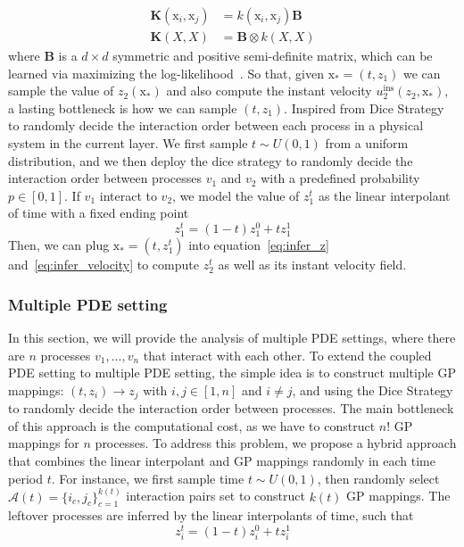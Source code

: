 \documentclass{article}
\begin{document}
\begin{align}
    \mathbf{K}(\mathrm{x}_i, \mathrm{x}_j) &= k(\mathrm{x}_i, \mathrm{x}_j) \mathbf{B} \\
    \mathbf{K}(X, X) &= \mathbf{B} \otimes k(X,X)
\end{align}
where $\mathbf{B}$ is a $d \times d$ symmetric and positive semi-definite matrix, which can be learned via maximizing the log-likelihood~\citep{BonillaMultitaskGauss}.
So that, given $\mathrm{x}_* =(t, z_1)$ we can sample the value of $z_2(\mathrm{x}_*)$ and also compute the instant velocity $u^{\text{ins}}_2 (z_2, \mathrm{x}_*)$, a lasting bottleneck is how we can sample $(t, z_1)$. Inspired from Dice Strategy~\citep{xiao2023coupled} to randomly decide the interaction order between each process in a physical system in the current layer. We first sample $t \sim U(0,1)$ from a uniform distribution, and we then deploy the dice strategy to randomly decide the interaction order between processes $v_1$ and $v_2$ with a predefined probability $p \in [0,1]$. If $v_1$ interact to $v_2$, we model the value of $z^t_1$ as the linear interpolant of time with a fixed ending point
\begin{equation}
    z^t_1 = (1-t)z^0_1 + t z^1_1
\end{equation}
Then, we can plug $\mathrm{x}_* =(t, z^t_1)$ into equation~\ref{eq:infer_z} and~\ref{eq:infer_velocity} to compute $z^t_2$ as well as its instant velocity field.
\subsubsection{Multiple PDE setting}
\label{sec:Gaussian_multiple}
In this section, we will provide the analysis of multiple PDE settings, where there are $n$ processes $v_1, ..., v_n$ that interact with each other. To extend the coupled PDE setting to multiple PDE setting, the simple idea is to construct multiple GP mappings: $(t, z_i) \to z_j$ with $i,j \in [1,n]$ and $i \neq j$, and using the Dice Strategy to randomly decide the interaction order between processes. The main bottleneck of this approach is the computational cost, as we have to construct $n!$ GP mappings for $n$ processes. To address this problem, we propose a hybrid approach that combines the linear interpolant and GP mappings randomly in each time period $t$. For instance, we first sample time $t \sim U(0,1)$, then randomly select $\mathcal{A}(t) = \{i_{c},j_c \}^{k(t)}_{c= 1}$ interaction pairs set to construct $k(t)$ GP mappings. The leftover processes are inferred by the linear interpolants of time, such that
\begin{equation}
    z^{t}_i = (1-t)z^{0}_i + t z^1_i
\end{equation}
\end{document}

